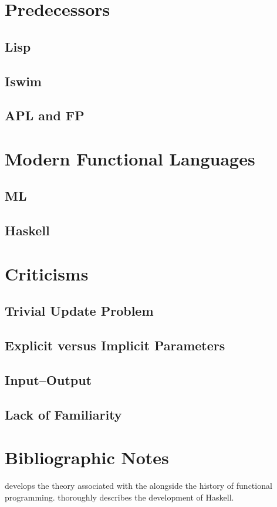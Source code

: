 \label{functional:history}
\section{Predecessors}
\subsection{Lisp}

\subsection{Iswim}

\subsection{APL and FP}

\section{Modern Functional Languages}
\subsection{ML}

\subsection{Haskell}

\section{Criticisms}
\subsection{Trivial Update Problem}
\subsection{Explicit versus Implicit Parameters}
\subsection{Input--Output}
\subsection{Lack of Familiarity}

\section{Bibliographic Notes}
\citet{Hudak:Conception:1989} develops the theory associated with the \lambdacalc alongside the history of functional programming. \citet{Hudak:A-history:2007} thoroughly describes the development of Haskell.

